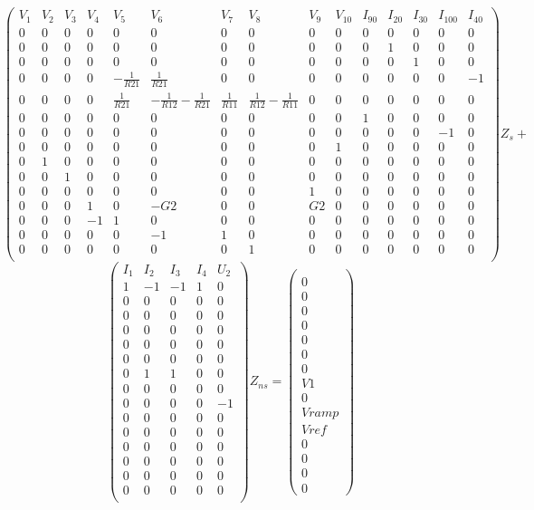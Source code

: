 \[
\left(\begin{array}{ccccccccccccccc}
  V_{1}&V_{2}&V_{3}&V_{4}&V_{5}&V_{6}&V_{7}&V_{8}&V_{9}&V_{10}&I_{90}&I_{20}&I_{30}&I_{100}&I_{40}\\
  \hline
  0&0&0&0&0&0&0&0&0&0&0&0&0&0&0\\
  0&0&0&0&0&0&0&0&0&0&0&1&0&0&0\\
  0&0&0&0&0&0&0&0&0&0&0&0&1&0&0\\
  0&0&0&0&-\frac{1}{R21}&\frac{1}{R21}&0&0&0&0&0&0&0&0&-1\\
  0&0&0&0&\frac{1}{R21}&-\frac{1}{R12}-\frac{1}{R21}&\frac{1}{R11}&\frac{1}{R12}-\frac{1}{R11}&0&0&0&0&0&0&0\\
  0&0&0&0&0&0&0&0&0&0&1&0&0&0&0\\
  0&0&0&0&0&0&0&0&0&0&0&0&0&-1&0\\
  0&0&0&0&0&0&0&0&0&1&0&0&0&0&0\\
  0&1&0&0&0&0&0&0&0&0&0&0&0&0&0\\
  0&0&1&0&0&0&0&0&0&0&0&0&0&0&0\\
  0&0&0&0&0&0&0&0&1&0&0&0&0&0&0\\
  0&0&0&1&0&-G2&0&0&G2&0&0&0&0&0&0\\
  0&0&0&-1&1&0&0&0&0&0&0&0&0&0&0\\
  0&0&0&0&0&-1&1&0&0&0&0&0&0&0&0\\
  0&0&0&0&0&0&0&1&0&0&0&0&0&0&0\\
\end{array}\right)Z_{s}+\]
\[
\left(\begin{array}{ccccc}
  I_{1}&I_{2}&I_{3}&I_{4}&U_{2}\\
  \hline
  1&-1&-1&1&0\\
  0&0&0&0&0\\
  0&0&0&0&0\\
  0&0&0&0&0\\
  0&0&0&0&0\\
  0&0&0&0&0\\
  0&1&1&0&0\\
  0&0&0&0&0\\
  0&0&0&0&-1\\
  0&0&0&0&0\\
  0&0&0&0&0\\
  0&0&0&0&0\\
  0&0&0&0&0\\
  0&0&0&0&0\\
  0&0&0&0&0\\
\end{array}\right)Z_{ns}=
\left(\begin{array}{c}
  \\
0\\0\\0\\0\\0\\0\\0\\V1\\0\\Vramp\\Vref\\0\\0\\0\\0
\end{array}\right)\]
